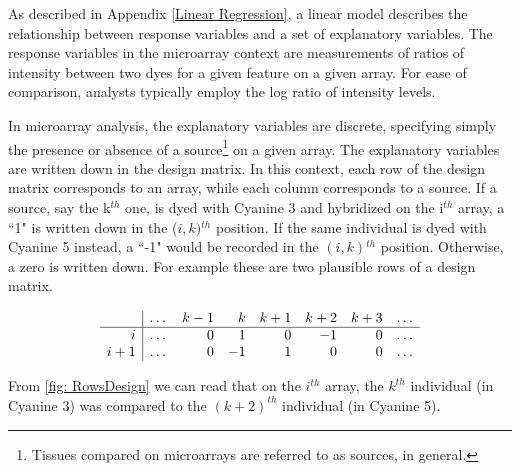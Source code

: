  As described in Appendix \ref{Linear Regression}, a linear model describes the relationship between response variables and a set of explanatory variables. The response variables in the microarray context are measurements of ratios of intensity between two dyes for a given feature on a given array. For ease of comparison, analysts typically employ the log ratio of intensity levels. 
 
 In microarray analysis, the explanatory variables are discrete, specifying simply the presence or absence of a source\footnote{Tissues compared on microarrays are referred to as sources, in general.} on a given array. The explanatory variables are written down in  the design matrix. In this context, each row of the design matrix corresponds to an array, while each column corresponds to a source. If a source, say the k$^{th}$ one, is dyed with Cyanine 3 and hybridized on the i$^{th}$ array, a ``1" is written down in the ($i,k)$$^{th}$ position. If the same individual is dyed with Cyanine 5 instead, a ``-1" would be recorded in the $(i,k)$$^{th}$ position. Otherwise, a zero is written down. For example these are two plausible rows of a design matrix.
 
 \begin{eqnarray}\begin{array}{ r | r r r r r r r} 
 	\label{fig: RowsDesign}
 
    &  \dots & k -1 &k &k+1 & k+2 & k+3 & \dots \\ \hline		
i  &\dots & 0 & 1 & 0 & -1 & 0 &\dots\\
i+1 & \dots &  0 & -1 & 1 & 0 & 0 &\dots \\

\end{array}
\end{eqnarray}
 
 From \ref{fig: RowsDesign} we can read that on the $i^{th}$ array, the $k^{th}$ individual (in Cyanine 3) was compared to the $(k+2) ^{th}$ individual (in Cyanine 5). 
 
